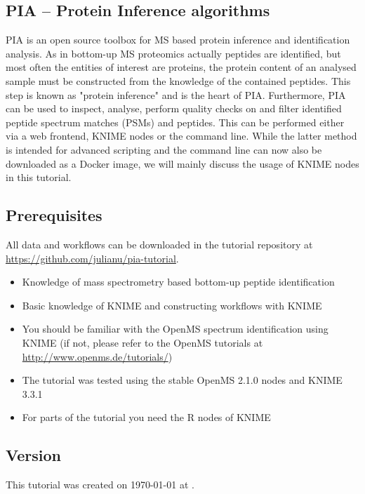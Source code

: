 \documentclass[a4paper,11pt,twoside]{article}
\begin{document}
\subsection{PIA -- Protein Inference algorithms}

PIA is an open source toolbox for MS based protein inference and identification
analysis. As in bottom-up MS proteomics actually peptides are identified, but
most often the entities of interest are proteins, the protein content of an
analysed sample must be constructed from the knowledge of the contained
peptides. This step is known as "protein inference" and is the heart of PIA.
Furthermore, PIA can be used to inspect, analyse, perform quality checks
on and filter identified peptide spectrum matches (PSMs) and peptides. This can
be performed either via a web frontend, KNIME nodes or the command line. While
the latter method is intended for advanced scripting and the command line can
now also be downloaded as a Docker image, we will mainly discuss the usage of
KNIME nodes in this tutorial.


\subsection{Prerequisites}

All data and workflows can be downloaded in the tutorial repository at
\url{https://github.com/julianu/pia-tutorial}.

\begin{itemize}
	\item Knowledge of mass spectrometry based bottom-up peptide identification
	\item Basic knowledge of KNIME and constructing workflows with KNIME
	\item You should be familiar with the OpenMS spectrum identification using
	KNIME (if not, please refer to the OpenMS tutorials at
	\url{http://www.openms.de/tutorials/})
	\item The tutorial was tested using the stable OpenMS 2.1.0 nodes and KNIME
	3.3.1
	\item For parts of the tutorial you need the R nodes of KNIME
\end{itemize}

\subsection{Version}

This tutorial was created on \today{} at \currenttime{}.
\end{document}
